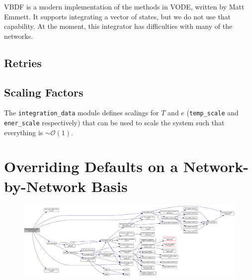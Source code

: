 VBDF is a modern implementation of the methods in VODE, written by
Matt Emmett.  It supports integrating a vector of states, but we do
not use that capability.  At the moment, this integrator has
difficulties with many of the networks.


\subsection{Retries}


\subsection{Scaling Factors}

The {\tt integration\_data} module defines scalings for $T$ and $e$
({\tt temp\_scale} and {\tt ener\_scale} respectively) that can be
used to scale the system such that everything is $\sim
\mathcal{O}(1)$.  


\section{Overriding Defaults on a Network-by-Network Basis}


\begin{figure}
\centering
\includegraphics[width=\linewidth]{doxygen_network}
\end{figure}
